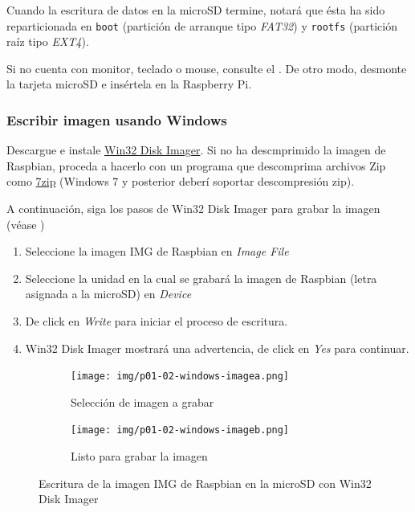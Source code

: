 \documentclass[letterpaper,10.5pt]{article}
\begin{document}
Cuando la escritura de datos en la microSD termine, notará que ésta ha sido reparticionada en \texttt{boot} (partición de arranque tipo \textit{FAT32}) y \texttt{rootfs} (partición raíz tipo \textit{EXT4}).

Si no cuenta con monitor, teclado o mouse, consulte el .
De otro modo, desmonte la tarjeta microSD e insértela en la Raspberry Pi.

%
%
\subsubsection{Escribir imagen usando Windows}%
Descargue e instale \href{https://sourceforge.net/projects/win32diskimager/}{Win32 Disk Imager}.
Si no ha descmprimido la imagen de Raspbian, proceda a hacerlo con un programa que descomprima archivos Zip como \href{https://www.7-zip.org/download.html}{7zip} (Windows 7 y posterior deberí soportar descompresión zip).

A continuación, siga los pasos de Win32 Disk Imager para grabar la imagen (véase )
\begin{enumerate}[noitemsep]
	\item Seleccione la imagen IMG de Raspbian en \emph{Image File}
	\item Seleccione la unidad en la cual se grabará la imagen de Raspbian (letra asignada a la microSD) en \emph{Device}
	\item De click en \emph{Write} para iniciar el proceso de escritura.
	\item Win32 Disk Imager mostrará una advertencia, de click en \emph{Yes} para continuar.
\end{enumerate}

\begin{figure}[H]
	\centering%
	\begin{subfigure}[b]{0.5\linewidth}
		\centering
		\texttt{[image: img/p01-02-windows-imagea.png]} %
		\caption{Selección de imagen a grabar}
		\label{fig:write-image-windows-a} %
	\end{subfigure}%
	\begin{subfigure}[b]{0.5\linewidth}
		\centering
		\texttt{[image: img/p01-02-windows-imageb.png]} %
		\caption{Listo para grabar la imagen}
		\label{fig:write-image-windows-b} %
	\end{subfigure}
	\caption{Escritura de la imagen IMG de Raspbian en la microSD con Win32 Disk Imager}%
	\label{fig:write-image-windows} %
\end{figure}
\end{document}
